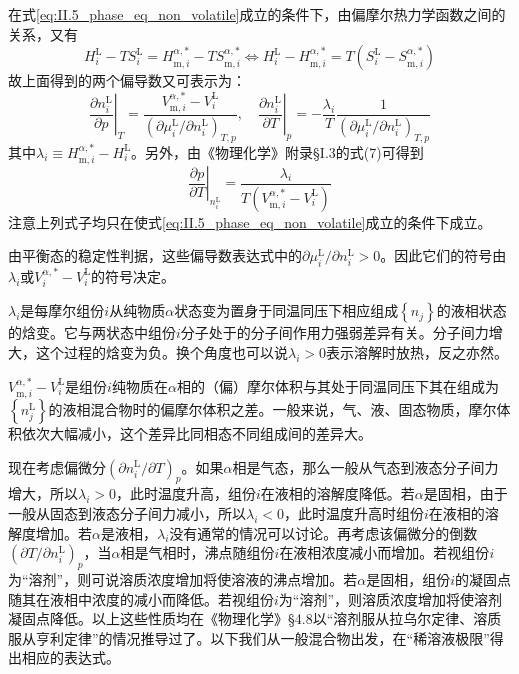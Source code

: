 \documentclass[main.tex]{subfiles}
\begin{document}
在式\eqref{eq:II.5_phase_eq_non_volatile}成立的条件下，由偏摩尔热力学函数之间的关系，又有
\[H_i^\text{L}-TS_i^\text{L}=H_{\text{m},i}^{\alpha,*}-TS_{\text{m},i}^{\alpha,*}\Leftrightarrow H_i^\text{L}-H_{\text{m},i}^{\alpha,*}=T\left(S_i^\text{L}-S_{\text{m},i}^{\alpha,*}\right)\]
故上面得到的两个偏导数又可表示为：
\[\left.\frac{\partial n_i^\text{L}}{\partial p}\right|_{T}=\frac{V_{\text{m},i}^{\alpha,*}-V_i^\text{L}}{\left(\partial \mu_i^\text{L}/\partial n_i^\text{L}\right)_{T,p}},\quad\left.\frac{\partial n_i^\text{L}}{\partial T}\right|_{p}=-\frac{\lambda_i}{T}\frac{1}{\left(\partial\mu_i^\text{L}/\partial n_i^\text{L}\right)_{T,p}}\]
其中$\lambda_i\equiv H_{\text{m},i}^{\alpha,*}-H_i^\text{L}$。另外，由《物理化学》附录\S I.3的式(7)可得到
\[\left.\frac{\partial p}{\partial T}\right|_{n_i^\text{L}}=\frac{\lambda_i}{T\left(V_{\text{m},i}^{\alpha,*}-V_i^\text{L}\right)}\]
注意上列式子均只在使式\eqref{eq:II.5_phase_eq_non_volatile}成立的条件下成立。

由平衡态的稳定性判据，这些偏导数表达式中的$\partial\mu_i^\text{L}/\partial n_i^\text{L}>0$。因此它们的符号由$\lambda_i$或$V_i^{\alpha,*}-V_i^\text{L}$的符号决定。

$\lambda_i$是每摩尔组份$i$从纯物质$\alpha$状态变为置身于同温同压下相应组成$\left\{n_j\right\}$的液相状态的焓变。它与两状态中组份$i$分子处于的分子间作用力强弱差异有关。分子间力增大，这个过程的焓变为负。换个角度也可以说$\lambda_i>0$表示溶解时放热，反之亦然。

$V_{\text{m},i}^{\alpha,*}-V_i^\text{L}$是组份$i$纯物质在$\alpha$相的（偏）摩尔体积与其处于同温同压下其在组成为$\left\{n_j^\text{L}\right\}$的液相混合物时的偏摩尔体积之差。一般来说，气、液、固态物质，摩尔体积依次大幅减小，这个差异比同相态不同组成间的差异大。

现在考虑偏微分$\left(\partial n_i^\text{L}/\partial T\right)_{p}$。如果$\alpha$相是气态，那么一般从气态到液态分子间力增大，所以$\lambda_i>0$，此时温度升高，组份$i$在液相的溶解度降低。若$\alpha$是固相，由于一般从固态到液态分子间力减小，所以$\lambda_i<0$，此时温度升高时组份$i$在液相的溶解度增加。若$\alpha$是液相，$\lambda_i$没有通常的情况可以讨论。再考虑该偏微分的倒数$\left(\partial T/\partial n_i^\text{L}\right)_p$，当$\alpha$相是气相时，沸点随组份$i$在液相浓度减小而增加。若视组份$i$为“溶剂”，则可说溶质浓度增加将使溶液的沸点增加。若$\alpha$是固相，组份$i$的凝固点随其在液相中浓度的减小而降低。若视组份$i$为“溶剂”，则溶质浓度增加将使溶剂凝固点降低。以上这些性质均在《物理化学》\S4.8以“溶剂服从拉乌尔定律、溶质服从亨利定律”的情况推导过了。以下我们从一般混合物出发，在“稀溶液极限”得出相应的表达式。
\end{document}
